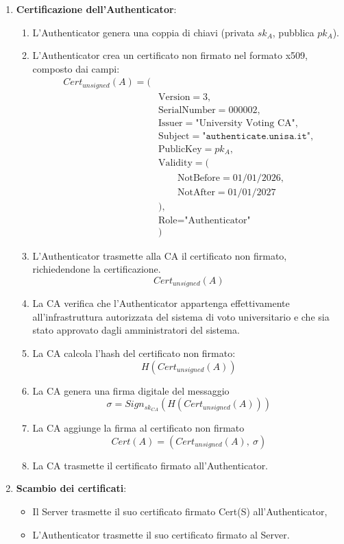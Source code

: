 \begin{enumerate}
	\item \textbf{Certificazione dell'Authenticator}:
		\begin{enumerate}
			\item L'Authenticator genera una coppia di chiavi (privata $sk_A$, pubblica $pk_A$).
			\item L'Authenticator crea un certificato non firmato nel formato x509, composto dai campi:
			$$
			\begin{aligned}
				Cert_{unsigned}(A) = (& \\
				&\text{Version} = 3, \\
				&\text{SerialNumber} = 000002, \\
				&\text{Issuer} = \text{"University Voting CA"}, \\
				&\text{Subject} = \texttt{"authenticate.unisa.it"}, \\
				&\text{PublicKey} = pk_A, \\
				&\text{Validity} = ( \\
				&\qquad \text{NotBefore} = 01/01/2026, \\
				&\qquad \text{NotAfter} = 01/01/2027 \\
				&), \\
				&\text{Role} = \text{"Authenticator"} \\
				&)
			\end{aligned}
			$$
			\item L'Authenticator trasmette alla CA il certificato non firmato, richiedendone la certificazione. $$Cert_{unsigned}(A)$$
			\item La CA verifica che l'Authenticator appartenga effettivamente all’infrastruttura autorizzata del sistema di voto universitario e che sia stato approvato dagli amministratori del sistema. 
			\item La CA calcola l'hash del certificato non firmato: $$H(Cert_{unsigned}(A))$$
			\item La CA genera una firma digitale del messaggio $$\sigma=Sign_{sk_{CA}}(H(Cert_{unsigned}(A)))$$
			\item La CA aggiunge la firma al certificato non firmato $$Cert(A)=(Cert_{unsigned}(A),\ \sigma)$$
			\item La CA trasmette il certificato firmato all'Authenticator.
		\end{enumerate}
		
	\item \textbf{Scambio dei certificati}:
		\begin{itemize}
			\item Il Server trasmette il suo certificato firmato Cert(S) all'Authenticator,
			\item L'Authenticator trasmette il suo certificato firmato al Server.
		\end{itemize}	
		

\end{enumerate}
